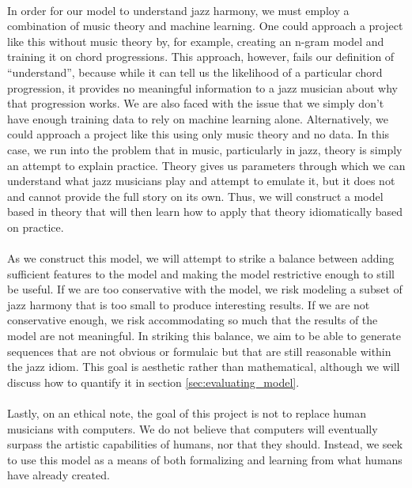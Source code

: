 \documentclass[]{article}
\begin{document}
\paragraph{} In order for our model to understand jazz harmony, we must employ a combination of music theory and machine learning.  One could approach a project like this without music theory by, for example, creating an n-gram model and training it on chord progressions.  This approach, however, fails our definition of ``understand'', because while it can tell us the likelihood of a particular chord progression, it provides no meaningful information to a jazz musician about why that progression works.  We are also faced with the issue that we simply don't have enough training data to rely on machine learning alone.  Alternatively, we could approach a project like this using only music theory and no data.  In this case, we run into the problem that in music, particularly in jazz, theory is simply an attempt to explain practice.  Theory gives us parameters through which we can understand what jazz musicians play and attempt to emulate it, but it does not and cannot provide the full story on its own.  Thus, we will construct a model based in theory that will then learn how to apply that theory idiomatically based on practice.

\paragraph{} As we construct this model, we will attempt to strike a balance between adding sufficient features to the model and making the model restrictive enough to still be useful.  If we are too conservative with the model, we risk modeling a subset of jazz harmony that is too small to produce interesting results.  If we are not conservative enough, we risk accommodating so much that the results of the model are not meaningful.  In striking this balance, we aim to be able to generate sequences that are not obvious or formulaic but that are still reasonable within the jazz idiom.  This goal is aesthetic rather than mathematical, although we will discuss how to quantify it in section \ref{sec:evaluating_model}.

\paragraph{} Lastly, on an ethical note, the goal of this project is not to replace human musicians with computers.  We do not believe that computers will eventually surpass the artistic capabilities of humans, nor that they should.  Instead, we seek to use this model as a means of both formalizing and learning from what humans have already created.
\end{document}
